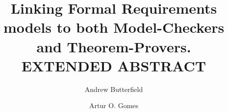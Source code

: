 \documentclass[a4paper, twocolumn]{esapub2005} %
\begin{document}
\title{
  Linking Formal Requirements models to both Model-Checkers and Theorem-Provers.
  \newline
  EXTENDED ABSTRACT
}

\author{Andrew Butterfield}
\author{Artur O. Gomes}


\date{}

\maketitle





\end{document}
